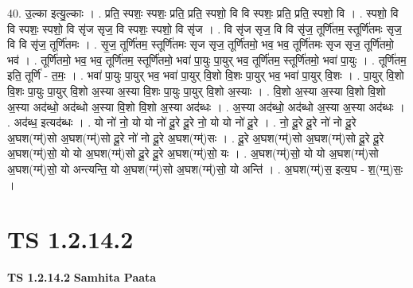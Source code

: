 \documentclass[17pt]{extarticle}
\begin{document}
40. उ॒ल्का इत्यु॒ल्काः । . प्रति॒ स्पशः॒ स्पशः॒ प्रति॒ प्रति॒ स्पशो॒ वि वि स्पशः॒ प्रति॒ प्रति॒ स्पशो॒ वि । . स्पशो॒ वि वि स्पशः॒ स्पशो॒ वि सृ॑ज सृज॒ वि स्पशः॒ स्पशो॒ वि सृ॑ज । . वि सृ॑ज सृज॒ वि वि सृ॑ज॒ तूर्णि॑तम॒ स्तूर्णि॑तमः सृज॒ वि वि सृ॑ज॒ तूर्णि॑तमः । . सृ॒ज॒ तूर्णि॑तम॒ स्तूर्णि॑तमः सृज सृज॒ तूर्णि॑तमो॒ भव॒ भव॒ तूर्णि॑तमः सृज सृज॒ तूर्णि॑तमो॒ भव॑ । . तूर्णि॑तमो॒ भव॒ भव॒ तूर्णि॑तम॒ स्तूर्णि॑तमो॒ भवा॑ पा॒युः पा॒युर् भव॒ तूर्णि॑तम॒ स्तूर्णि॑तमो॒ भवा॑ पा॒युः । . तूर्णि॑तम॒ इति॒ तूर्णि॑ - त॒मः॒ । . भवा॑ पा॒युः पा॒युर् भव॒ भवा॑ पा॒युर् वि॒शो वि॒शः पा॒युर् भव॒ भवा॑ पा॒युर् वि॒शः । . पा॒युर् वि॒शो वि॒शः पा॒युः पा॒युर् वि॒शो अ॒स्या अ॒स्या वि॒शः पा॒युः पा॒युर् वि॒शो अ॒स्याः । . वि॒शो अ॒स्या अ॒स्या वि॒शो वि॒शो अ॒स्या अद॑ब्धो॒ अद॑ब्धो अ॒स्या वि॒शो वि॒शो अ॒स्या अद॑ब्धः । . अ॒स्या अद॑ब्धो॒ अद॑ब्धो अ॒स्या अ॒स्या अद॑ब्धः । . अद॑ब्ध॒ इत्यद॑ब्धः । . यो नो॑ नो॒ यो यो नो॑ दू॒रे दू॒रे नो॒ यो यो नो॑ दू॒रे । . नो॒ दू॒रे दू॒रे नो॑ नो दू॒रे अ॒घश(ग्म्॑)सो अ॒घश(ग्म्॑)सो दू॒रे नो॑ नो दू॒रे अ॒घश(ग्म्॑)सः । . दू॒रे अ॒घश(ग्म्॑)सो अ॒घश(ग्म्॑)सो दू॒रे दू॒रे अ॒घश(ग्म्॑)सो॒ यो यो अ॒घश(ग्म्॑)सो दू॒रे दू॒रे अ॒घश(ग्म्॑)सो॒ यः । . अ॒घश(ग्म्॑)सो॒ यो यो अ॒घश(ग्म्॑)सो अ॒घश(ग्म्॑)सो॒ यो अन्त्यन्ति॒ यो अ॒घश(ग्म्॑)सो अ॒घश(ग्म्॑)सो॒ यो अन्ति॑ । . अ॒घश(ग्म्॑)स॒ इत्य॒घ - श॒(ग्म्॒)सः॒ । \newline
\pagebreak
{}

\section{ TS 1.2.14.2 }

\textbf{TS 1.2.14.2 } \newline
\textbf{Samhita Paata} \newline
\end{document}
